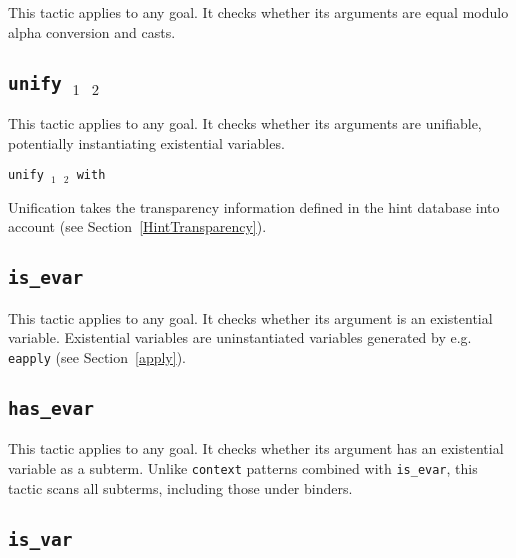 \begin{coq_example*}
This tactic applies to any goal. It checks whether its arguments are
equal modulo alpha conversion and casts.

\ErrMsg {}

\subsection{\tt unify \term$_1$ \term$_2$}
\label{unify}

This tactic applies to any goal. It checks whether its arguments are
unifiable, potentially instantiating existential variables.

\ErrMsg {}

\begin{Variants}
\item {\tt unify \term$_1$ \term$_2$ with \ident}

  Unification takes the transparency information defined in the
  hint database {\tt \ident} into account (see Section~\ref{HintTransparency}).
\end{Variants}

\subsection{\tt is\_evar \term}
\label{isevar}

This tactic applies to any goal. It checks whether its argument is an
existential variable. Existential variables are uninstantiated
variables generated by e.g. {\tt eapply} (see Section~\ref{apply}).

\ErrMsg {}

\subsection{\tt has\_evar \term}
\label{hasevar}

This tactic applies to any goal. It checks whether its argument has an
existential variable as a subterm. Unlike {\tt context} patterns
combined with {\tt is\_evar}, this tactic scans all subterms,
including those under binders.

\ErrMsg {}

\subsection{\tt is\_var \term}
\label{isvar}


\end{coq_example*}
